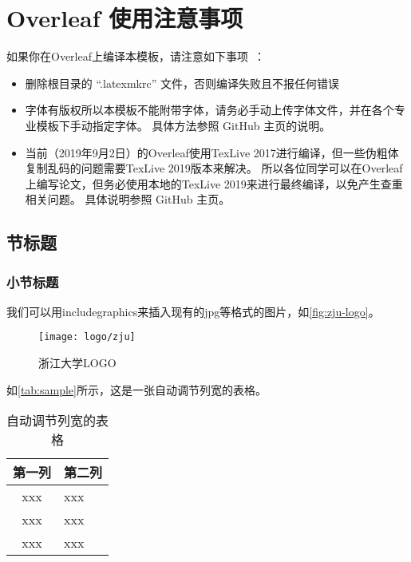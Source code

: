 \cleardoublepage

\section{Overleaf 使用注意事项}

如果你在Overleaf上编译本模板，请注意如下事项~\cite{zjuthesis}：

\begin{itemize}
    \item 删除根目录的 ``.latexmkrc'' 文件，否则编译失败且不报任何错误
    \item 字体有版权所以本模板不能附带字体，请务必手动上传字体文件，并在各个专业模板下手动指定字体。
        具体方法参照 GitHub 主页的说明。
    \item 当前（2019年9月2日）的Overleaf使用TexLive 2017进行编译，但一些伪粗体复制乱码的问题需要TexLive 2019版本来解决。
        所以各位同学可以在Overleaf上编写论文，但务必使用本地的TexLive 2019来进行最终编译，以免产生查重相关问题。
        具体说明参照 GitHub 主页。
\end{itemize}

\subsection{节标题}

\subsubsection{小节标题}

\par 我们可以用includegraphics来插入现有的jpg等格式的图片，如\autoref{fig:zju-logo}。

\begin{figure}[ht]
    \centering
    \texttt{[image: logo/zju]}
    \caption{\label{fig:zju-logo}浙江大学LOGO}
\end{figure}

\par 如\autoref{tab:sample}所示，这是一张自动调节列宽的表格。

\begin{table}[ht]
    \caption{\label{tab:sample}自动调节列宽的表格}
    \begin{tabularx}{\linewidth}{|c|X<{\centering}|}
        \hline
        第一列 & 第二列 \\ \hline
        xxx & xxx \\ \hline
        xxx & xxx \\ \hline
        xxx & xxx \\ \hline
    \end{tabularx}
\end{table}

